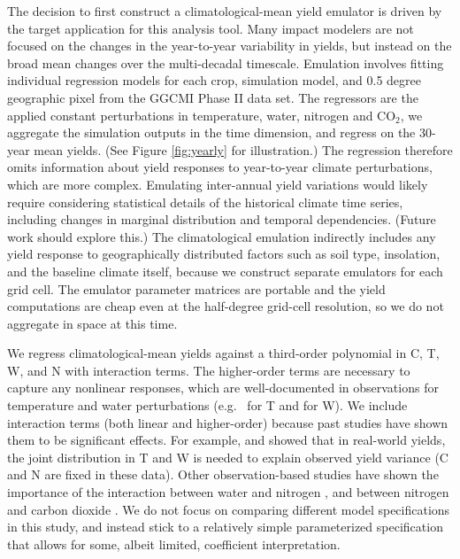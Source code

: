 \documentclass[preprint, 5p, times, twocolumn]{elsarticle}
\begin{document}
The decision to first construct a climatological-mean yield emulator is driven by the target application for this analysis tool. Many impact modelers are not focused on the changes in the year-to-year variability in yields, but instead on the broad mean changes over the multi-decadal timescale. Emulation involves fitting individual regression models for each crop, simulation model, and 0.5 degree geographic pixel from the GGCMI Phase II data set. The regressors are the applied constant perturbations in temperature, water, nitrogen and CO$_2$, we aggregate the simulation outputs in the time dimension, and regress on the 30-year mean yields. (See Figure \ref{fig:yearly} for illustration.) The regression therefore omits information about yield responses to year-to-year climate perturbations, which are more complex. Emulating inter-annual yield variations would likely require considering statistical details of the historical climate time series, including changes in marginal distribution and temporal dependencies. (Future work should explore this.) The climatological emulation indirectly includes any yield response to geographically distributed factors such as soil type, insolation, and the baseline climate itself, because we construct separate emulators for each grid cell. The emulator parameter matrices are portable and the yield computations are cheap even at the half-degree grid-cell resolution, so we do not aggregate in space at this time.

We regress climatological-mean yields against a third-order polynomial in C, T, W, and N with interaction terms. The higher-order terms are necessary to capture any nonlinear responses, which are well-documented in observations for temperature and water perturbations (e.g.\ \citet{Schlenker2009} for T and \citet{He2016} for W). We include interaction terms (both linear and higher-order)  because past studies have shown them to be significant effects. For example, \citet{Lobell2007} and \citet{Tebaldi2008} showed that in real-world yields, the joint distribution in T and W is needed to explain observed yield variance (C and N are fixed in these data). Other observation-based studies have shown the importance of the interaction between water and nitrogen \citep[e.g.\ ][]{AULAKH2005}, and between nitrogen and carbon dioxide \citep{Mitsuru92, Nakamura97}. We do not focus on comparing different model specifications in this study, and instead stick to a relatively simple parameterized specification that allows for some, albeit limited, coefficient interpretation. 
\end{document}
